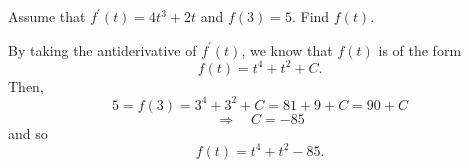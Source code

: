 \documentclass[nooutcomes]{ximera}
\begin{document}
\begin{problem}
Assume that $f^\prime (t) = 4t^3 + 2t$ and $f(3) = 5$.  Find $f(t)$.
		\begin{freeResponse}
		By taking the antiderivative of $f^\prime (t)$, we know that $f(t)$ is of the form
		$$f(t) = t^4 + t^2 + C .$$
		Then,
		$$ 5 = f(3) = 3^4 + 3^2 + C = 81 + 9 + C = 90 + C$$
		$$\Longrightarrow \quad  C = -85 $$
		and so
		$$ f(t) = t^4 + t^2 - 85. $$
		\end{freeResponse}
		
		
		

\end{problem}
	
	
	
	
	
	
	
	
			
			

\begin{problem}

		\begin{freeResponse}
			
		\end{freeResponse}
			
			
		
\end{problem}











\begin{problem}

		\begin{freeResponse}

		\end{freeResponse}
			
			
	
\end{problem}






	
	
	
	
	
	
	
	
	

	










								
				
				
	
\end{document}
